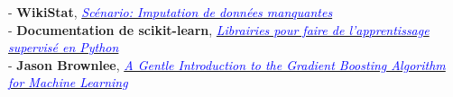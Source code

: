 \documentclass[14pt, openany]{article}
\begin{document}
\begin{flushleft}
- \textbf{WikiStat}, \href{https://www.math.univ-toulouse.fr/~besse/Wikistat/pdf/st-scenar-app-idm.pdf}{\textit{\textcolor{blue}{Scénario: Imputation de données manquantes}}}\\
\medskip
- \textbf{Documentation de scikit-learn}, \href{http://scikit-learn.org/stable/supervised_learning.html#supervised-learning}{\textit{\textcolor{blue}{Librairies pour faire de l'apprentissage supervisé en Python}}}\\
\medskip
- \textbf{Jason Brownlee}, \href{https://machinelearningmastery.com/gentle-introduction-gradient-boosting-algorithm-machine-learning/}{\textit{\textcolor{blue}{A Gentle Introduction to the Gradient Boosting Algorithm for Machine Learning}}}\\
\end{flushleft}
\end{document}
